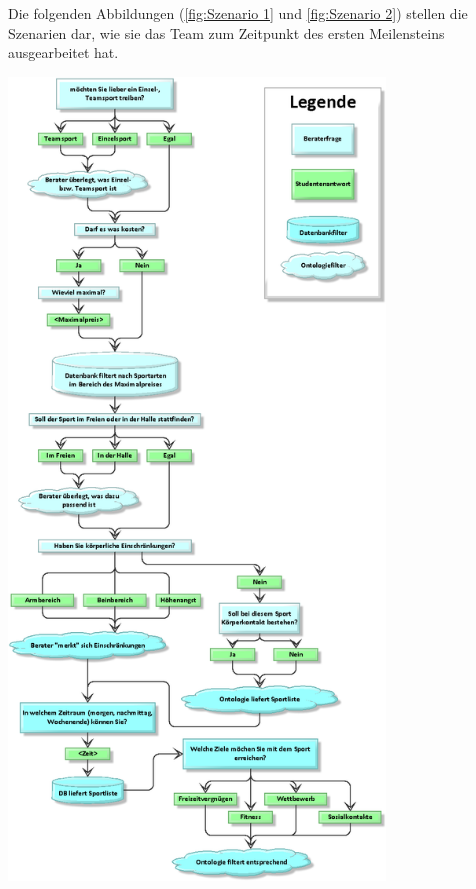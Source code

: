 Die folgenden Abbildungen (\ref{fig:Szenario 1} und \ref{fig:Szenario 2}) stellen die Szenarien dar, wie sie das Team zum Zeitpunkt des ersten Meilensteins ausgearbeitet hat.

\begin{capfigure}[Szenario 1]
	\includegraphics[width=100mm]{images/szenario1.png}
\end{capfigure}

